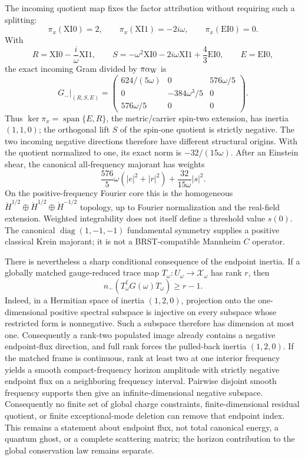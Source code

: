 \documentclass[11pt]{article}
\begin{document}
The incoming quotient map fixes the factor attribution without requiring
such a splitting:
\[
 \pi_x(\mathrm{XI0})=2,\qquad
 \pi_x(\mathrm{XI1})=-2i\omega,\qquad
 \pi_x(\mathrm{EI0})=0.
\]
With
\[
 R=\mathrm{XI0}-\frac{i}{\omega}\mathrm{XI1},\qquad
 S=-\omega^2\mathrm{XI0}-2i\omega\mathrm{XI1}
   +\frac43\mathrm{EI0},\qquad E=\mathrm{EI0},
\]
the exact incoming Gram divided by \(\pi\alpha_{\rm W}\) is
\[
 \left.G_-\right|_{(R,S,E)}=
 \begin{pmatrix}
 624/(5\omega)&0&576\omega/5\\
 0&-384\omega^3/5&0\\
 576\omega/5&0&0
 \end{pmatrix}.
\]
Thus \(\ker\pi_x=\operatorname{span}\{E,R\}\), the metric/carrier
spin-two extension, has inertia \((1,1,0)\); the orthogonal lift \(S\) of
the spin-one quotient is strictly negative.  The two incoming negative
directions therefore have different structural origins.
With the quotient normalized to one, its exact norm is
\(-32/(15\omega)\).  After an Einstein shear, the canonical all-frequency
majorant has weights
\[
 \frac{576}{5}\omega(|e|^2+|r|^2)
 +\frac{32}{15\omega}|s|^2.
\]
On the positive-frequency Fourier core this is the homogeneous
\(\dot H^{1/2}\oplus\dot H^{1/2}\oplus\dot H^{-1/2}\) topology, up to
Fourier normalization and the real-field extension.  Weighted integrability
does not itself define a threshold value \(s(0)\).  The canonical
\(\operatorname{diag}(1,-1,-1)\) fundamental symmetry supplies a positive
classical Krein majorant; it is not a BRST-compatible Mannheim \(C\)
operator.

There is nevertheless a sharp conditional consequence of the endpoint
inertia.  If a globally matched gauge-reduced trace map
\(T_\omega:U_\omega\to\mathcal X_\omega\) has rank \(r\), then
\[
 n_-\!\left(T_\omega^\dagger G(\omega)T_\omega\right)\geq r-1.
\]
Indeed, in a Hermitian space of inertia \((1,2,0)\), projection onto the
one-dimensional positive spectral subspace is injective on every subspace
whose restricted form is nonnegative.  Such a subspace therefore has
dimension at most one.  Consequently a rank-two populated image already
contains a negative endpoint-flux direction, and full rank forces the
pulled-back inertia \((1,2,0)\).  If the matched frame is continuous, rank at
least two at one interior frequency yields a smooth compact-frequency
horizon amplitude with strictly negative endpoint flux on a neighboring
frequency interval.  Pairwise disjoint smooth frequency supports then give
an infinite-dimensional negative subspace.  Consequently no finite set of
global charge constraints, finite-dimensional residual quotient, or finite
exceptional-mode deletion can remove that endpoint index.  This remains a
statement about endpoint flux, not
total canonical energy, a quantum ghost, or a complete scattering matrix;
the horizon contribution to the global conservation law remains separate.
\end{document}
